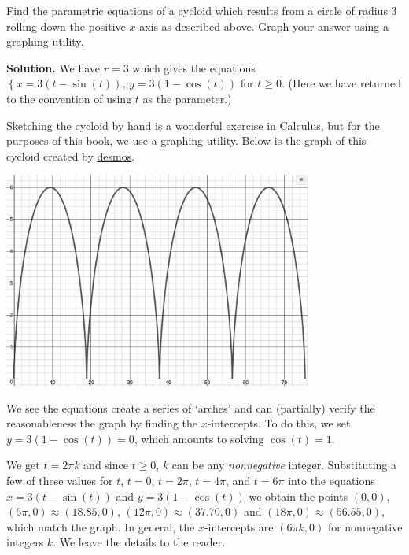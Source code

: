 \documentclass{ximera}
\begin{document}
\begin{ex} \label{cycloidex}  Find the parametric equations of a cycloid which results from a circle of radius $3$ rolling down the positive $x$-axis as described above.  Graph your answer using a graphing utility.

\smallskip

{\bf Solution.}  We have $r = 3$ which gives the equations $\left\{ x = 3(t -\sin(t)), \, y = 3(1-\cos(t)) \right.$ for $t \geq 0$.  (Here we have returned to the convention of using $t$ as the parameter.)   

\smallskip

Sketching the cycloid by hand is a wonderful exercise in Calculus, but for the purposes of this book, we use a graphing utility.  Below is the graph of this cycloid created by \href{https://www.desmos.com/calculator}{\underline{desmos}}.


\begin{center}

\includegraphics[width=4in]{./ParametricEquationsGraphics/cycloid.jpg}

\end{center}

We see the equations create a series of `arches' and can (partially) verify the reasonableness the graph by finding the $x$-intercepts.  To do this, we set $y = 3(1-\cos(t)) = 0$, which amounts to solving $\cos(t) = 1$.  

\smallskip

We get $t = 2 \pi k$ and since $t \geq 0$, $k$ can be any \textit{nonnegative} integer.  Substituting a few of these values for $t$, $t = 0$, $t = 2\pi$, $t = 4\pi$, and $t=6\pi$ into the equations $x = 3(t -\sin(t))$ and $y = 3(1-\cos(t))$ we obtain the points $(0,0)$, $(6\pi, 0) \approx (18.85, 0)$,  $(12 \pi,0) \approx (37.70, 0)$ and $(18\pi, 0) \approx ( 56.55 , 0)$, which match the graph. In general, the $x$-intercepts are $(6\pi k, 0)$ for nonnegative integers $k$.  We leave the details to the reader.


\end{ex}
\end{document}
